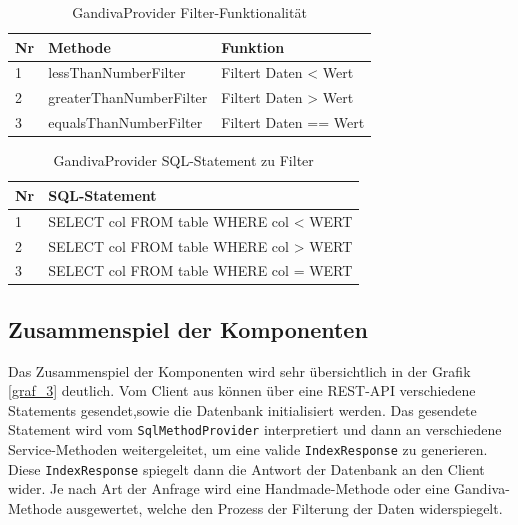 \begin{table}[H]
\begin{center}
    \begin{tabular}{| l | l | l |}
    \hline
     Nr & Methode & Funktion \\ \hline
    1 & lessThanNumberFilter & Filtert Daten < Wert  \\ \hline
    2 & greaterThanNumberFilter & Filtert Daten > Wert \\ \hline
    3 & equalsThanNumberFilter & Filtert Daten == Wert  \\ \hline
    \end{tabular}
\end{center}
\caption{GandivaProvider Filter-Funktionalität}
\label{GandivaProvider Filter-Funktionalität}
\end{table}

\begin{table}[H]
\begin{center}
    \begin{tabular}{| l | l |}
    \hline
     Nr & SQL-Statement \\ \hline
    1 & SELECT col FROM table WHERE col < WERT  \\ \hline
    2 & SELECT col FROM table WHERE col > WERT  \\ \hline
    3 & SELECT col FROM table WHERE col = WERT   \\ \hline
    \end{tabular}
\end{center}
\caption{GandivaProvider SQL-Statement zu Filter}
\label{GandivaProvider SQL-Statement zu Filter}
\end{table}

\subsection{Zusammenspiel der Komponenten}
Das Zusammenspiel der Komponenten wird sehr übersichtlich in der Grafik \ref{graf_3} deutlich. Vom Client aus können über eine REST-API verschiedene Statements gesendet,sowie die Datenbank initialisiert werden.
Das gesendete Statement wird vom \texttt{SqlMethodProvider} interpretiert und dann an verschiedene Service-Methoden weitergeleitet, um eine valide \texttt{IndexResponse} zu generieren. Diese \texttt{IndexResponse} spiegelt dann die Antwort der Datenbank an den Client wider. Je nach Art der Anfrage wird eine Handmade-Methode oder eine Gandiva-Methode ausgewertet, welche den Prozess der Filterung der Daten widerspiegelt.


